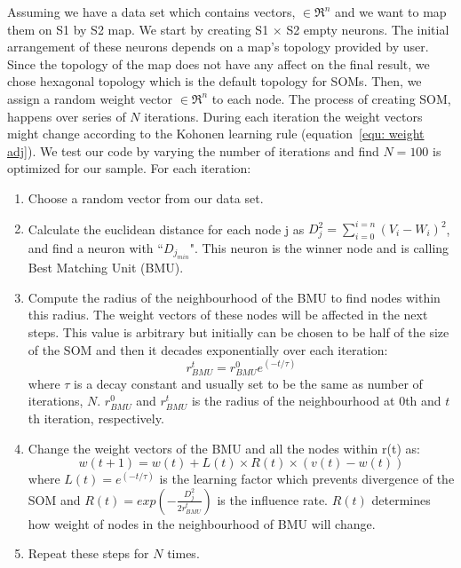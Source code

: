      Assuming we have a data set which contains vectors,  $\in \Re^n$ and we want to map them on S1 by S2 map. 
     We start by creating S1 $\times$ S2 empty neurons. 
     The initial arrangement of these neurons depends on a map's topology provided by user.
     Since the topology of the map does not have any affect on the final result, we chose hexagonal topology which is the default topology for SOMs.
     Then, we assign a random weight vector  $\in \Re^n$ to each node.
     The process of creating SOM, happens over series of $N$ iterations. 
     During each iteration the weight vectors might change according to the Kohonen learning rule (equation~\ref{equ: weight adj}). 
     We test our code by varying the number of iterations and find $N = 100$ is optimized for our sample. For each iteration:
     \begin{enumerate}
     \item Choose a random vector from our data set.
     \item Calculate the euclidean distance for each node j as  $D_j^2= \sum_{i=0}^{i=n} (V_i - W_i)^2$, and find a neuron with ``$D_{j_{min}}$". This neuron is the winner node and is calling Best Matching Unit (BMU). 
     \item  Compute the radius of the neighbourhood of the BMU to find nodes within this radius. The weight vectors of these nodes will be affected in the next steps. This value is arbitrary but initially can be chosen to be half of the size of the SOM and then it decades exponentially over each iteration:
   \begin{equation}
   r^t_{BMU} = r^0_{BMU}e^{(-t/\tau)}
   \end{equation}
   where $\tau$ is a decay constant and usually set to be the same as number of iterations, $N$. $r^0_{BMU}$ and $r^t_{BMU}$ is the radius of the neighbourhood at 0th and $t$th iteration, respectively. 
   \item Change the weight vectors of the BMU and all the nodes within r(t) as:
   \begin{equation}
   \label{equ: weight adj}
   w(t+1)=w(t)+L(t) \times R(t) \times(v(t)-w(t))
   \end{equation}
   where $L(t) = e^{(-t/\tau)}$ is the learning factor which prevents divergence of the SOM and $R(t)=exp(-\frac{D_j^2}{2r^t_{BMU}})$ is the influence rate. $R(t)$ determines how weight of nodes in the neighbourhood of BMU will change.
   \item  Repeat these steps for $N$ times.
    \end{enumerate}
   
